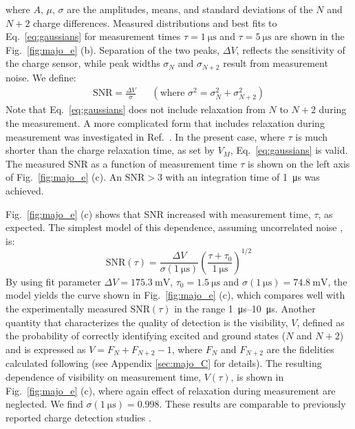 where $A$, $\mu$, $\sigma$ are the amplitudes, means, and standard deviations of the $N$ and $N+2$ charge differences. Measured distributions and best fits to Eq.~\eqref{eq:gaussians} for measurement times $\tau = \SI{1}{\micro\second}$ and $\tau = \SI{5}{\micro\second}$ are shown in the Fig.~\ref{fig:majo_e} (b). Separation of the two peaks, $\Delta V$, reflects the sensitivity of the charge sensor, while peak widths $\sigma_{N}$ and $\sigma_{N+2}$ result from measurement noise. We define:
\begin{align}
	\textrm{SNR} = \frac{\Delta V}{\sigma} && (\textrm{where }\sigma^{2} = \sigma_{N}^2+\sigma_{N+2}^2)
\end{align}
Note that Eq.~\eqref{eq:gaussians} does not include relaxation from $N$ to $N+2$ during the measurement. A more complicated form that includes relaxation during measurement was investigated in Ref.~\cite{barthel2009rapid}. In the present case, where $\tau$ is much shorter than the charge relaxation time, as set by $V_{M}$, Eq.~\eqref{eq:gaussians} is valid. The measured SNR as a function of measurement time $\tau$ is shown on the left axis of Fig.~\ref{fig:majo_e} (c). An $\textrm{SNR} > 3$ with an integration time of \SI{1}{\micro\second} was achieved.

Fig.~\ref{fig:majo_e} (c) shows that SNR increased with measurement time, $\tau$, as expected. The simplest model of this dependence, assuming uncorrelated noise \cite{sensingdot}, is:
\begin{equation}
	\textrm{SNR}(\tau) = \frac{\Delta V}{\sigma(\SI{1}{\micro\second})}\left(\frac{\tau+\tau_{0}}{\SI{1}{\micro\second}}\right)^{1/2}
\end{equation}
By using fit parameter $\Delta V = \SI{175.3}{\milli\volt}$, $\tau_{0} = \SI{1.5}{\micro\second}$ and $\sigma(\SI{1}{\micro\second}) = \SI{74.8}{\milli\volt}$, the model yields the curve shown in Fig.~\ref{fig:majo_e} (c), which compares well with the experimentally measured $\textrm{SNR}(\tau)$ in the range \SIrange{1}{10}{\micro\second}. Another quantity that characterizes the quality of detection is the visibility, $V$, defined as the probability of correctly identifying excited and ground states ($N$ and $N+2$) and is expressed as $V = F_{N} + F_{N+2} - 1$, where $F_{N}$ and $F_{N+2}$ are the fidelities calculated following \cite{barthel2009rapid} (see Appendix \ref{sec:majo_C} for details). The resulting dependence of visibility on measurement time, $V(\tau)$, is shown in Fig.~\ref{fig:majo_e} (c), where again effect of relaxation during measurement are neglected. We find $\sigma(\SI{1}{\micro\second}) = 0.998$. These results are comparable to previously reported charge detection studies \cite{PhysRevApplied.11.044061,spin6,sens2,sens3,rf_nw2}.

